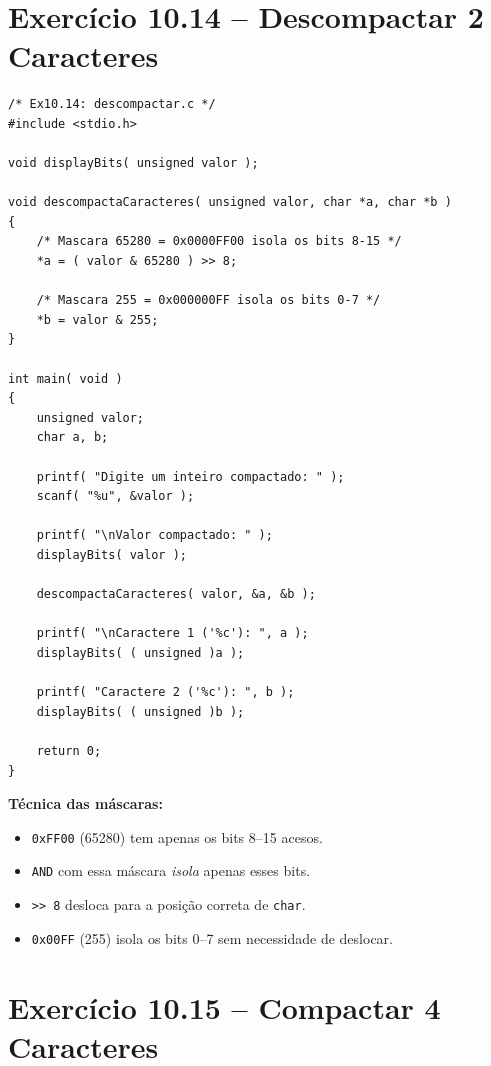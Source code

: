 \documentclass[12pt,a4paper]{article}
\begin{document}
\newpage

\section{Exercício 10.14 -- Descompactar 2 Caracteres}

\begin{respostabox}
\begin{lstlisting}
/* Ex10.14: descompactar.c */
#include <stdio.h>

void displayBits( unsigned valor );

void descompactaCaracteres( unsigned valor, char *a, char *b )
{
    /* Mascara 65280 = 0x0000FF00 isola os bits 8-15 */
    *a = ( valor & 65280 ) >> 8;

    /* Mascara 255 = 0x000000FF isola os bits 0-7 */
    *b = valor & 255;
}

int main( void )
{
    unsigned valor;
    char a, b;

    printf( "Digite um inteiro compactado: " );
    scanf( "%u", &valor );

    printf( "\nValor compactado: " );
    displayBits( valor );

    descompactaCaracteres( valor, &a, &b );

    printf( "\nCaractere 1 ('%c'): ", a );
    displayBits( ( unsigned )a );

    printf( "Caractere 2 ('%c'): ", b );
    displayBits( ( unsigned )b );

    return 0;
}
\end{lstlisting}

\textbf{Técnica das máscaras:}
\begin{itemize}[noitemsep]
  \item \texttt{0xFF00} (65280) tem apenas os bits 8--15 acesos.
  \item \texttt{AND} com essa máscara \textit{isola} apenas esses bits.
  \item \texttt{>> 8} desloca para a posição correta de \texttt{char}.
  \item \texttt{0x00FF} (255) isola os bits 0--7 sem necessidade de deslocar.
\end{itemize}
\end{respostabox}

\section{Exercício 10.15 -- Compactar 4 Caracteres}
\end{document}
